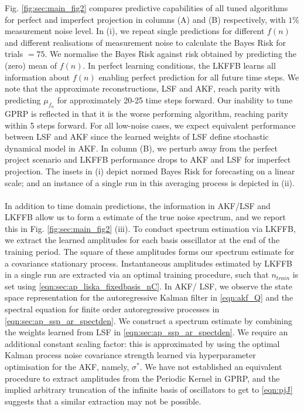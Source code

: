 Fig. \ref{fig:sec:main_fig2} compares predictive capabilities of all tuned algorithms for perfect and imperfect projection in columns (A) and (B) respectively, with $1\%$ measurement noise level. In (i), we repeat single predictions for different $f(n)$ and different realisations of measurement noise to calculate the Bayes Risk for trials $= 75$.  We normalise the Bayes Risk against risk obtained by predicting the (zero) mean of $f(n)$. In perfect learning conditions, the LKFFB learns all information about $f(n)$ enabling perfect prediction for all future time steps. We note that the approximate reconstructions, LSF and AKF, reach parity with predicting $\mu_{f_n}$ for approximately 20-25 time steps forward. Our inability to tune GPRP is reflected in that it is the worse performing algorithm, reaching parity within 5 steps forward. For all low-noise cases, we expect equivalent performance between LSF and AKF since the learned weights of LSF define stochastic dynamical model in AKF. In column (B), we perturb away from the perfect project scenario and LKFFB performance drops to AKF and LSF for imperfect projection. The insets in (i) depict normed Bayes Risk for forecasting on a linear scale; and an instance of a single run in this averaging process is depicted in (ii).
\\
\\
In addition to time domain predictions, the information in AKF/LSF and LKFFB allow us to form a estimate of the true noise spectrum, and we report this in Fig. \ref{fig:sec:main_fig2} (iii). To conduct spectrum estimation via LKFFB, we extract the learned amplitudes for each basis osscillator at the end of the training period. The square of these amplitudes forms our spectrum estimate for a covariance stationary process. Instantaneous amplitudes estimated by LKFFB in a single run are extracted via an optimal training procedure, such that $n_{train}$ is set using \eqref{eqn:sec:ap_liska_fixedbasis_nC}. In AKF/ LSF, we observe the state space representation for the autoregressive Kalman filter in \eqref{eqn:akf_Q} and the spectral equation for finite order autoregressive processes in \eqref{eqn:sec:ap_ssp_ar_spectden}. We construct a spectrum estimate by combining the weights learned from LSF in \eqref{eqn:sec:ap_ssp_ar_spectden}. We require an additional constant scaling factor: this is approximated by using the optimal Kalman process noise covariance strength learned via hyperparameter optimisation for the AKF, namely, $\sigma^*$. We have not established an equivalent procedure to extract amplitudes from the Periodic Kernel in GPRP, and the implied arbitrary truncation of the infinite basis of oscillators to get to \eqref{eqn:pjJ} suggests that a similar extraction may not be possible. 

